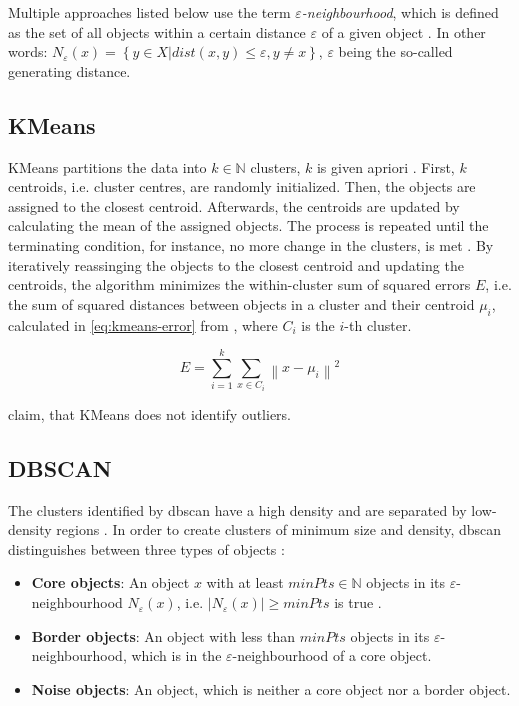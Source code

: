 Multiple approaches listed below use the term \textit{$\varepsilon$-neighbourhood}, which is defined as the set of all objects within a certain distance $\varepsilon$ of a given object \cite{OPTICS2013}.
In other words: $N_\varepsilon (x) = \left\{ y \in X | dist(x,y) \le \varepsilon, y \neq x \right\}$, $\varepsilon$ being the so-called generating distance.


\subsection{KMeans}\label{subsec:kmeans}

KMeans partitions the data into $k \in \mathbb{N}$  clusters, $k$ is given apriori \cite{OPTICS_kMeans_2016}. %
First, $k$ centroids, i.e. cluster centres, are randomly initialized.
Then, the objects are assigned to the closest centroid.
Afterwards, the centroids are updated by calculating the mean of the assigned objects.
The process is repeated until the terminating condition, for instance, no more change in the clusters, is met \cite{OPTICS_kMeans_2016}.
By iteratively reassinging the objects to the closest centroid and updating the centroids, 
the algorithm minimizes the within-cluster sum of squared errors $E$, i.e. the sum of squared distances between objects in a cluster and their centroid $\mu_{i}$, 
calculated in \autoref{eq:kmeans-error} from \cite{OPTICS_kMeans_2016}, 
where $C_{i}$ is the $i$-th cluster.

\begin{equation}
    E = \sum_{i=1}^{k} \sum_{x \in C_{i}}\left\|x-\mu_{i}\right\|^{2}
\label{eq:kmeans-error}
\end{equation}

\citeauthor{OPTICS_kMeans_2016} claim, that KMeans does not identify outliers.


\subsection{DBSCAN}\label{subsec:dbscan}

The clusters identified by \ac{dbscan} have a high density and are separated by low-density regions \cite{OPTICS_kMeans_2016}.
In order to create clusters of minimum size and density, \ac{dbscan} distinguishes between three types of objects \cite{OPTICS_kMeans_2016}:

\begin{itemize}
    \item \textbf{Core objects}: 
    An object $x$ with at least $minPts \in \mathbb{N}$ objects in its $\varepsilon$-neighbourhood $N_\varepsilon(x)$, i.e. $| N_\varepsilon (x) | \geq minPts$ is true \cite{OPTICS2013}.

    \item \textbf{Border objects}: 
    An object with less than $minPts$ objects in its $\varepsilon$-neighbourhood, which is in the $\varepsilon$-neighbourhood of a core object.

    \item \textbf{Noise objects}: 
    An object, which is neither a core object nor a border object.
\end{itemize}

